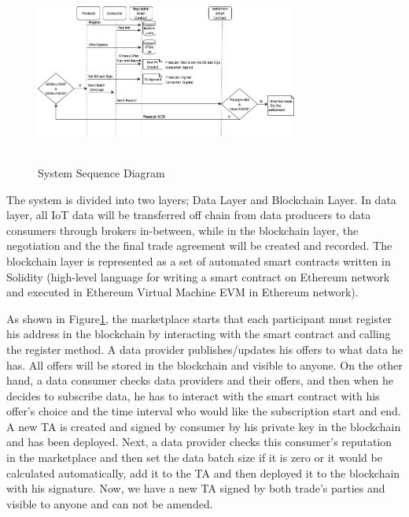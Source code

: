 \documentclass[letterpaper, 10 pt, conference]{ieeeconf}  %
\begin{document}
\begin{figure}
  \caption{System Sequence Diagram}
  \label{SSD}
  \includegraphics[height= 2.4in, width=3.4in]{SystemArchWithBackground}
  \centering
\end{figure}

The system is divided into two layers; Data Layer and Blockchain Layer. In data layer, all IoT data will be transferred off chain from data producers to data consumers through brokers in-between, while in the blockchain layer, the negotiation and the the final trade agreement will be created and recorded. The blockchain layer is represented as a set of automated smart contracts written in Solidity (high-level language for writing a smart contract on Ethereum network and executed in Ethereum Virtual Machine EVM in Ethereum network).

As shown in Figure\ref{SSD}, the marketplace starts that each participant must register his address in the blockchain by interacting with the smart contract and calling the register method. A data provider publishes/updates his offers to what data he has. All offers will be stored in the blockchain and visible to anyone. On the other hand, a data consumer checks data providers and their offers, and then when he decides to subscribe data, he has to interact with the smart contract with his offer’s choice and the time interval who would like the subscription start and end. A new TA is created and signed by consumer by his private key in the blockchain and has been deployed. Next, a data provider checks this consumer’s reputation in the marketplace and then set the data batch size if it is zero or it would be calculated automatically, add it to the TA and then deployed it to the blockchain with his signature. Now, we have a new TA signed by both trade’s parties and visible to anyone and can not be amended. 
\end{document}
